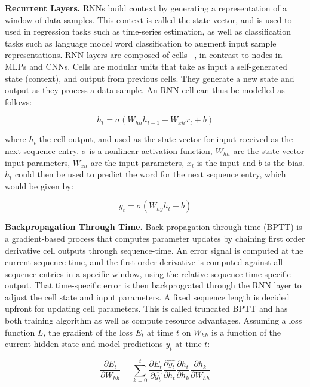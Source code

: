 \textbf{Recurrent Layers.} RNNs build context by generating a representation of a window of data samples. This context is called the state vector, and is used to used in regression tasks such as time-series estimation, as well as classification tasks such as language model word classification to augment input sample representations. RNN layers are composed of cells ~\citep{DLIndaba2018}, in contrast to nodes in MLPs and CNNs. Cells are modular units that take as input a self-generated state (context), and output from previous cells. They generate a new state and output as they process a data sample. An RNN cell can thus be modelled as follows: 

\begin{equation}
	h_t = \sigma(W_{hh}h_{t-1} + W_{xh}x_t + b)
\end{equation}

where $h_t$ the cell output, and used as the state vector for input received as the next sequence entry. $\sigma$ is a nonlinear activation function, $W_{hh}$ are the state vector input parameters, $W_{xh}$ are the input parameters, $x_t$ is the input and $b$ is the bias. $h_t$ could then be used to predict the word for the next sequence entry, which would be given by:

\begin{equation}
	y_t = \sigma(W_{hy}h_{t} + b)
\end{equation}

\textbf{Backpropagation Through Time.} Back-propagation through time (BPTT) is a gradient-based process that computes parameter updates by chaining first order derivative cell outputs through sequence-time. An error signal is computed at the current sequence-time, and the first order derivative is computed against all sequence entries in a specific window, using the relative sequence-time-specific output. That time-specific error is then backprograted through the RNN layer to adjust the cell state and input parameters. A fixed sequence length is decided upfront for updating cell parameters. This is called truncated BPTT and has both training algorithm as well as compute resource advantages. \newpage
Assuming a loss function $L$, the gradient of the loss $E_t$ at time $t$ on $W_{hh}$ is a function of the current hidden state and model predictions $\hat{y_t}$ at time $t$:  

\begin{equation}
	\frac{\partial E_t} {\partial W_{hh}} = \sum_{k=0}^{t}\frac{\partial E_t} {\partial \hat{y_t}}\frac{\partial \hat{y_t}} {\partial h_t}\frac{\partial h_t} {\partial h_k}\frac{\partial h_k} {\partial W_{hh}}
\end{equation}

